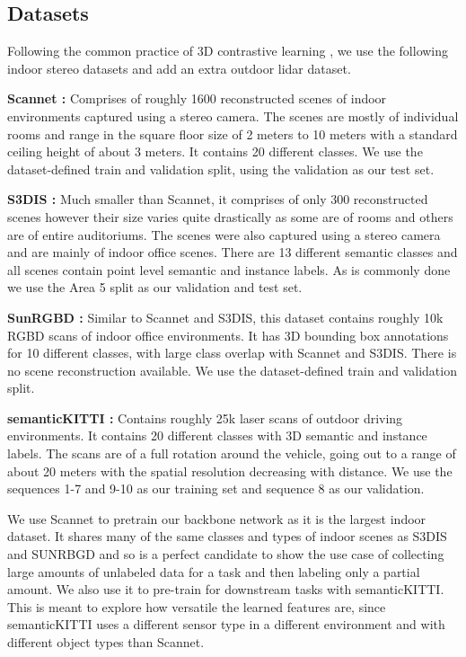 \documentclass[10pt,twocolumn,letterpaper]{article}
\begin{document}
\subsection{Datasets}
\label{sec:results:datasets}

Following the common practice of 3D contrastive learning \cite{xie2020pointcontrast, hou2021Exploring, zhang2021Self, jiang2021Guided}, we use the following indoor stereo datasets and add an extra outdoor lidar dataset.

\textbf{Scannet \cite{Dai2017ScanNet}:} Comprises of roughly 1600 reconstructed scenes of indoor environments captured using a stereo camera. The scenes are mostly of individual rooms and range in the square floor size of 2 meters to 10 meters with a standard ceiling height of about 3 meters. It contains 20 different classes. We use the dataset-defined train and validation split, using the validation as our test set.

\textbf{S3DIS \cite{armeni20163D}:} Much smaller than Scannet, it comprises of only 300 reconstructed scenes however their size varies quite drastically as some are of rooms and others are of entire auditoriums. The scenes were also captured using a stereo camera and are mainly of indoor office scenes. There are 13 different semantic classes and all scenes contain point level semantic and instance labels. As is commonly done \cite{xie2020pointcontrast, hou2021Exploring} we use the Area 5 split as our validation and test set.

\textbf{SunRGBD \cite{song2015sunrgbd, janoch2011category, xiao2013database, silberman2012indoor}:} Similar to Scannet and S3DIS, this dataset contains roughly 10k RGBD scans of indoor office environments. It has 3D bounding box annotations for 10 different classes, with large class overlap with Scannet and S3DIS. There is no scene reconstruction available. We use the dataset-defined train and validation split.

\textbf{semanticKITTI \cite{behley2019semantic, geiger2012are}: } Contains roughly 25k laser scans of outdoor driving environments. It contains 20 different classes with 3D semantic and instance labels. The scans are of a full rotation around the vehicle, going out to a range of about 20 meters with the spatial resolution decreasing with distance. We use the sequences 1-7 and 9-10 as our training set and sequence 8 as our validation.

We use Scannet to pretrain our backbone network as it is the largest indoor dataset. It shares many of the same classes and types of indoor scenes as S3DIS and SUNRBGD and so is a perfect candidate to show the use case of collecting large amounts of unlabeled data for a task and then labeling only a partial amount. We also use it to pre-train for downstream tasks with semanticKITTI. This is meant to explore how versatile the learned features are, since semanticKITTI uses a different sensor type in a different environment and with different object types than Scannet.
\end{document}
